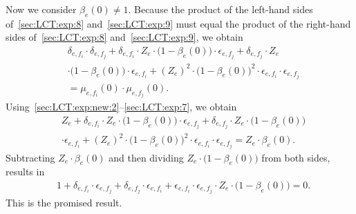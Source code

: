 \documentclass[journal]{IEEEtran}
\newcommand{\add}[1]{{\color{black}#1}}
\newcommand{\beli}{\beta}
\newcommand{\efi}{ e,f_i }
\newcommand{\efj}{ e,f_j }
\begin{document}
\begin{appendices}
\begin{enumerate}
          Now we consider $ \beli_e(0) \neq 1$.
          Because the product of the left-hand sides
          of~\eqref{sec:LCT:exp:8}
          and~\eqref{sec:LCT:exp:9} must equal the product of the
          right-hand sides of~\eqref{sec:LCT:exp:8}
          and~\eqref{sec:LCT:exp:9}, we obtain
          \begin{align*}
             &
            \delta_{\efi}
            \cdot
            \delta_{\efj}
            +
            \delta_{\efi}
            \cdot
            Z_e
            \cdot
            \bigl( 1 - \beli_e(0) \bigr)
            \cdot
            \epsilon_{\efj}
            +
            \delta_{\efj}
            \cdot
            Z_e
            \\
             & \cdot
            \bigl( 1 - \beli_e(0) \bigr)
            \cdot
            \epsilon_{\efi}
            +
            (Z_e)^2
            \cdot
            \bigl( 1 - \beli_e(0) \bigr)^2
            \cdot
            \epsilon_{\efi}
            \cdot
            \epsilon_{\efj} \\
             &
            = \mu_{\efi}(0)
            \cdot
            \mu_{\efj}(0).
          \end{align*}
          \add{Using~\eqref{sec:LCT:exp:new:2}--\eqref{sec:LCT:exp:7}, we obtain}
          \begin{align*}
             & Z_e
            +
            \delta_{\efi}
            \cdot
            Z_e
            \cdot
            \bigl( 1 - \beli_e(0) \bigr)
            \cdot
            \epsilon_{\efj}
            +
            \delta_{\efj}
            \cdot
            Z_e
            \cdot
            \bigl( 1 - \beli_e(0) \bigr)
            \\
             & \cdot
            \epsilon_{\efi}
            +
            (Z_e)^2
            \cdot
            \bigl( 1 - \beli_e(0) \bigr)^2
            \cdot
            \epsilon_{\efi}
            \cdot
            \epsilon_{\efj} \nonumber  = Z_e \cdot \beli_e(0).
          \end{align*}
          Subtracting $Z_e \cdot \beli_e(0)$ and then dividing $ Z_e \cdot \bigl( 1 - \beli_e(0) \bigr) $ from both sides, results in
          \begin{align*}
             & 1
            \!+\!
            \delta_{\efi}
            \!\cdot\!
            \epsilon_{\efj}
            \!+\!
            \delta_{\efj}
            \!\cdot\!
            \epsilon_{\efi}
            \!+\!
            \epsilon_{\efi}
            \!\cdot\!
            \epsilon_{\efj}
            \!\cdot\! Z_e
            \!\cdot\!
            \bigl( 1 \!- \!\beli_e(0) \bigr)
            \!=\! 0.
          \end{align*}
          This is the promised result.


\end{enumerate}
\end{appendices}
\end{document}
